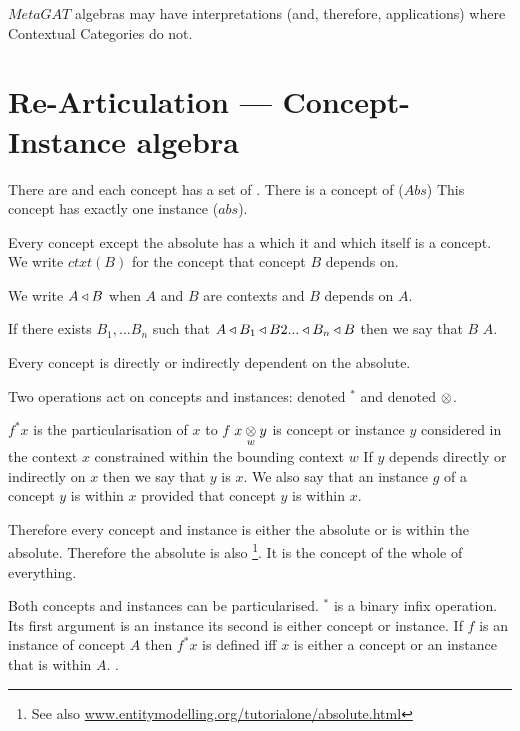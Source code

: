 \documentclass[10pt,a4paper]{article}
\begin{document}
\noindent $MetaGAT$ algebras may have interpretations (and, therefore, applications) where Contextual Categories do not.

\section{Re-Articulation ---  Concept-Instance algebra}

\note
There are  and each concept has a set of . There is a concept of ($Abs$)
 This concept has exactly one instance ($abs$). 

\note
Every concept except the absolute has a  which it  and which itself is a concept. 
We write $ctxt(B)$
for the  concept that concept $B$ depends on.

We write $A \base B$  when  $A$ and $B$ are contexts and $B$ depends on $A$.

\note
If there exists $B_1,...B_n$ such that
$A \base B_1 \base B2 ... \base B_n \base B$ then we say that $B$  $A$.

\note Every concept is directly or indirectly dependent on the absolute.

\note
Two operations act on concepts and instances:  denoted
$^*$ and   denoted $\cross$.

\note
$f^*x$ is the particularisation of $x$ to $f$
\note
$\crossx{x}{y}{w}$ is concept or instance $y$ considered in the context $x$ constrained within the bounding context $w$
\note
If $y$ depends directly or indirectly on $x$ then we say that $y$ is  $x$.
We also say that an instance $g$ of a concept $y$ is within $x$ provided that concept $y$ is within $x$.

\note 
Therefore every concept and instance is either the absolute or is within the absolute.
Therefore the absolute  is also \footnote{See also \url{www.entitymodelling.org/tutorialone/absolute.html}}. It is the concept of the whole of everything.


 \newpage

\note
Both concepts and instances can be particularised.
$^*$ is a binary infix operation. Its first argument is an instance its second is either concept or instance.
If $f$ is an instance of concept $A$ then $f^*x$ is defined iff $x$ is either a concept or an instance that is within $A$. 
.
\end{document}
